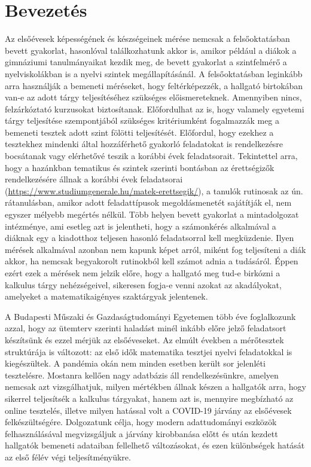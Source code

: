 \documentclass[12pt]{article}
\begin{document}
\tableofcontents
\newpage


\section{Bevezetés}
Az elsőévesek képességének és készségeinek mérése nemcsak a felsőoktatásban bevett gyakorlat, hasonlóval találkozhatunk akkor is, amikor például a diákok a gimnáziumi tanulmányaikat kezdik meg, de bevett gyakorlat a szintfelmérő a nyelviskolákban is a nyelvi szintek megállapításánál. A felsőoktatásban leginkább arra használják a bemeneti méréseket, hogy feltérképezzék, a hallgató birtokában van-e az adott tárgy teljesítéséhez szükséges előismereteknek. Amennyiben nincs, felzárkóztató kurzusokat biztosítanak. Előfordulhat az is, hogy valamely egyetemi tárgy teljesítése szempontjából szükséges kritériumként fogalmazzák meg a bemeneti tesztek adott szint fölötti teljesítését. Előfordul, hogy ezekhez a tesztekhez mindenki által hozzáférhető gyakorló feladatokat is rendelkezésre bocsátanak vagy elérhetővé teszik a korábbi évek feladatsorait. Tekintettel arra, hogy a hazánkban tematikus és szintek szerinti bontásban az érettségizők rendelkezésére állnak a korábbi évek feladatsorai (\url{https://www.studiumgenerale.hu/matek-erettsegik/}), a tanulók rutinosak az ún. rátanulásban, amikor adott feladattípusok megoldásmenetét sajátítják el, nem egyszer mélyebb megértés nélkül. Több helyen bevett gyakorlat a mintadolgozat intézménye, ami esetleg azt is jelentheti, hogy a számonkérés alkalmával a diáknak egy a kiadotthoz teljesen hasonló feladatsorral kell megküzdenie. Ilyen mérések alkalmával azonban nem kapunk képet arról, miként fog teljesíteni a diák akkor, ha nemcsak begyakorolt rutinokból kell számot adnia a tudásáról. Éppen ezért ezek a mérések nem jelzik előre, hogy a hallgató meg tud-e birkózni a kalkulus tárgy nehézségeivel, sikeresen fogja-e venni azokat az akadályokat, amelyeket a matematikaigényes szaktárgyak jelentenek.

A Budapesti Műszaki és Gazdaságtudományi Egyetemen több éve foglalkozunk azzal, hogy az ütemterv szerinti haladást minél inkább előre jelző feladatsort készítsünk és ezzel mérjük az elsőéveseket. Az elmúlt években a mérőtesztek struktúrája is változott: az első idők matematika tesztjei nyelvi feladatokkal is kiegészültek. A pandémia okán nem minden esetben került sor jelenléti tesztelésre. Mostanra kellően nagy adatbázis áll rendelkezésünkre, amelyen nemcsak azt vizsgálhatjuk, milyen mértékben állnak készen a hallgatók arra, hogy sikerrel teljesítsék a kalkulus tárgyakat, hanem azt is, mennyire megbízható az online tesztelés, illetve milyen hatással volt a COVID-19 járvány az elsőévesek felkészültségére. Dolgozatunk célja, hogy modern adattudományi eszközök felhasználásával megvizsgáljuk a járvány kirobbanása előtt és után kezdett hallgatók bemeneti adataiban fellelhető változásokat, és ezen különbségek hatását az első félév végi teljesítményükre.
\end{document}
